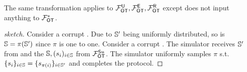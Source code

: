 \begin{remark}
	The same transformation applies to $\mathcal{F}_{\mathsf{OT}}^\mathsf{U},\mathcal{F}_{\mathsf{OT}}^\mathsf{E}, \mathcal{F}_{\mathsf{OT}}^\mathsf{R}$ except \send does not input anything to $\mathcal{F}_{\mathsf{OT}}^*$.
\end{remark}
 

\begin{proof}[sketch]
	Consider a corrupt \send. Due to $\mathsf{\mathbb S}'$ being uniformly distributed, so is $\mathsf{\mathbb S}=\pi(\mathsf{\mathbb S}')$ since $\pi$ is one to one. Consider a corrupt \rec. The simulator receives $\mathsf{\mathbb S}'$ from \rec and the $\mathsf{\mathbb S},(s_i)_{i\in\mathsf{\mathbb S}}$ from $\mathcal{F}_{\mathsf{OT}}^{\mathsf{S} u}$. The simulator uniformly samples $\pi$ s.t. $\{s_i\}_{i\in\mathsf{\mathbb S}} =\{s_{\pi(i)}\}_{i\in\mathsf{\mathbb S}'}$ and completes the protocol.
	\pe
\end{proof}